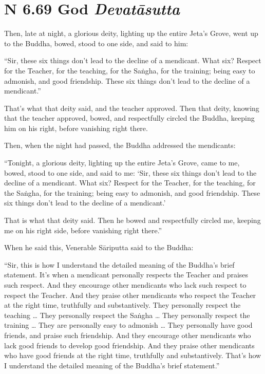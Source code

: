 \documentclass[12pt,openany]{book}%
\newcommand*{\suttatitleacronym}[1]{\smaller[2]{#1}\vspace*{.3em}}
\newcommand*{\suttatitletranslation}[1]{\linebreak{#1}}
\newcommand*{\suttatitleroot}[1]{\linebreak\smaller[2]\itshape{#1}}
\newcommand*{\tocacronym}[1]{\hspace*{-3.3em}{#1}\quad}
\newcommand*{\toctranslation}[1]{#1}
\newcommand*{\tocroot}[1]{(\textit{#1})}
\begin{document}
%
\section*{{\suttatitleacronym AN 6.69}{\suttatitletranslation A God }{\suttatitleroot Devatāsutta}}
\addcontentsline{toc}{section}{\tocacronym{AN 6.69} \toctranslation{A God } \tocroot{Devatāsutta}}

Then, late at night, a glorious deity, lighting up the entire Jeta’s Grove, went up to the Buddha, bowed, stood to one side, and said to him: 

“Sir, these six things don’t lead to the decline of a mendicant. What six? Respect for the Teacher, for the teaching, for the \textsanskrit{Saṅgha}, for the training; being easy to admonish, and good friendship. These six things don’t lead to the decline of a mendicant.” 

That’s what that deity said, and the teacher approved. Then that deity, knowing that the teacher approved, bowed, and respectfully circled the Buddha, keeping him on his right, before vanishing right there. 

Then, when the night had passed, the Buddha addressed the mendicants: 

“Tonight, a glorious deity, lighting up the entire Jeta’s Grove, came to me, bowed, stood to one side, and said to me: ‘Sir, these six things don’t lead to the decline of a mendicant. What six? Respect for the Teacher, for the teaching, for the \textsanskrit{Saṅgha}, for the training; being easy to admonish, and good friendship. These six things don’t lead to the decline of a mendicant.’ 

That is what that deity said. Then he bowed and respectfully circled me, keeping me on his right side, before vanishing right there.” 

When he said this, Venerable \textsanskrit{Sāriputta} said to the Buddha: 

“Sir, this is how I understand the detailed meaning of the Buddha’s brief statement. It’s when a mendicant personally respects the Teacher and praises such respect. And they encourage other mendicants who lack such respect to respect the Teacher. And they praise other mendicants who respect the Teacher at the right time, truthfully and substantively. They personally respect the teaching … They personally respect the \textsanskrit{Saṅgha} … They personally respect the training … They are personally easy to admonish … They personally have good friends, and praise such friendship. And they encourage other mendicants who lack good friends to develop good friendship. And they praise other mendicants who have good friends at the right time, truthfully and substantively. That’s how I understand the detailed meaning of the Buddha’s brief statement.” 
\end{document}
